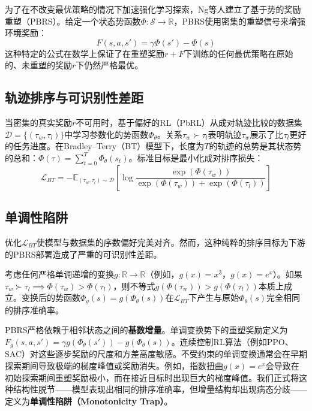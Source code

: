 为了在不改变最优策略的情况下加速强化学习探索，Ng等人\cite{ng1999}建立了基于势的奖励重塑（PBRS）。给定一个状态势函数$\Phi: \mathcal{S} \to \mathbb{R}$，PBRS使用密集的重塑信号来增强环境奖励：
\begin{equation}
\label{eq:pbrs}
    F(s, a, s') = \gamma \Phi(s') - \Phi(s)
\end{equation}
这种特定的公式在数学上保证了在重塑奖励$r + F$下训练的任何最优策略在原始的、未重塑的奖励$r$下仍然严格最优。

\subsection{轨迹排序与可识别性差距}

当密集的真实奖励$r$不可用时，基于偏好的RL（PbRL）从成对轨迹比较的数据集$\mathcal{D} = \{(\tau_w, \tau_l)\}$中学习参数化的势函数$\Phi_\theta$。关系$\tau_w \succ \tau_l$表明轨迹$\tau_w$展示了比$\tau_l$更好的任务进度。在Bradley--Terry（BT）模型\cite{bradley1952}下，长度为$T$的轨迹的总势是其状态势的总和：$\Phi(\tau) = \sum_{t=0}^T \Phi_\theta(s_t)$。标准目标是最小化成对排序损失：
\begin{equation}
\label{eq:bt}
    \mathcal{L}_{BT} = - \mathbb{E}_{(\tau_w, \tau_l) \sim \mathcal{D}} \left[ \log \frac{\exp(\Phi(\tau_w))}{\exp(\Phi(\tau_w)) + \exp(\Phi(\tau_l))} \right]
\end{equation}

\subsection{单调性陷阱}

优化$\mathcal{L}_{BT}$使模型与数据集的序数偏好完美对齐。然而，这种纯粹的排序目标为下游的PBRS部署造成了严重的可识别性差距。

考虑任何严格单调递增的变换$g: \mathbb{R} \to \mathbb{R}$（例如，$g(x) = x^3$，$g(x) = e^x$）。如果$\tau_w \succ \tau_l \implies \Phi(\tau_w) > \Phi(\tau_l)$，则不等式$g(\Phi(\tau_w)) > g(\Phi(\tau_l))$本质上成立。变换后的势函数$\Phi_g(s) = g(\Phi_\theta(s))$在$\mathcal{L}_{BT}$下产生与原始$\Phi_\theta(s)$完全相同的排序准确率。

PBRS严格依赖于相邻状态之间的\textbf{基数增量}。单调变换势下的重塑奖励定义为$F_g(s, a, s') = \gamma g(\Phi_\theta(s')) - g(\Phi_\theta(s))$。连续控制RL算法（例如PPO\cite{schulman2017}、SAC\cite{haarnoja2018}）对这些逐步奖励的尺度和方差高度敏感。不受约束的单调变换通常会在早期探索期间导致极端的梯度峰值或奖励消失。例如，指数扭曲$g(x) = e^x$会导致在初始探索期间重塑奖励极小，而在接近目标时出现巨大的梯度峰值。我们正式将这种结构性脱节——模型表现出相同的排序准确率，但增量结构却出现病态分歧——定义为\textbf{单调性陷阱（Monotonicity Trap）}。



